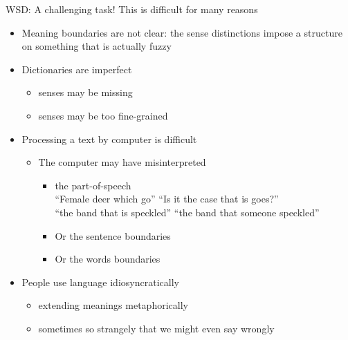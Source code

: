 

\begin{frame}[allowframebreaks]{WSD: A challenging task!}
  This is difficult for many reasons
  \begin{itemize}
  \item Meaning boundaries are not clear: the sense distinctions
    impose a structure on something that is actually fuzzy
  \item Dictionaries are imperfect
    \begin{itemize}
    \item senses may be missing
    \item senses may be too fine-grained
    \end{itemize}
  \item Processing a text by computer is difficult
    \begin{itemize}
    \item The computer may have misinterpreted
      \begin{itemize}
      \item the part-of-speech
        \\   ``Female deer which go'' ``Is it the case that is goes?''
        \\  ``the band that is speckled'' ``the band that someone speckled''
      \item Or the sentence boundaries
      \item Or the words boundaries
      \end{itemize}
    \end{itemize}
  \item People use language idiosyncratically 
    \begin{itemize}
    \item extending meanings metaphorically
    \item sometimes so strangely that we might even say wrongly
    \end{itemize}
  \end{itemize}

\end{frame}

